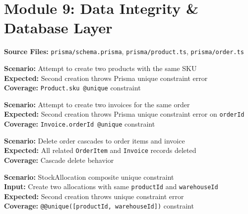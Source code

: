 \documentclass[12pt,a4paper]{report}
\newcommand{\pone}{\textbf{\color{p1red}P1}}
\newcommand{\ptwo}{\textbf{\color{p2orange}P2}}
\begin{document}
\section{Module 9: Data Integrity \& Database Layer}

\textbf{Source Files:} \texttt{prisma/schema.prisma}, \texttt{prisma/product.ts}, \texttt{prisma/order.ts}

\begin{tcolorbox}[criticalbox,title={DB-001 \hfill \pone\ --- SKU Uniqueness}]
\textbf{Scenario:} Attempt to create two products with the same SKU \\
\textbf{Expected:} Second creation throws Prisma unique constraint error \\
\textbf{Coverage:} \texttt{Product.sku @unique} constraint
\end{tcolorbox}

\begin{tcolorbox}[criticalbox,title={DB-002 \hfill \pone\ --- Invoice Uniqueness}]
\textbf{Scenario:} Attempt to create two invoices for the same order \\
\textbf{Expected:} Second creation throws Prisma unique constraint error on \texttt{orderId} \\
\textbf{Coverage:} \texttt{Invoice.orderId @unique} constraint
\end{tcolorbox}

\begin{tcolorbox}[testbox,title={DB-003 \hfill \ptwo}]
\textbf{Scenario:} Delete order cascades to order items and invoice \\
\textbf{Expected:} All related \texttt{OrderItem} and \texttt{Invoice} records deleted \\
\textbf{Coverage:} Cascade delete behavior
\end{tcolorbox}

\begin{tcolorbox}[testbox,title={DB-004 \hfill \ptwo}]
\textbf{Scenario:} StockAllocation composite unique constraint \\
\textbf{Input:} Create two allocations with same \texttt{productId} and \texttt{warehouseId} \\
\textbf{Expected:} Second creation throws unique constraint error \\
\textbf{Coverage:} \texttt{@@unique([productId, warehouseId])} constraint
\end{tcolorbox}
\end{document}

